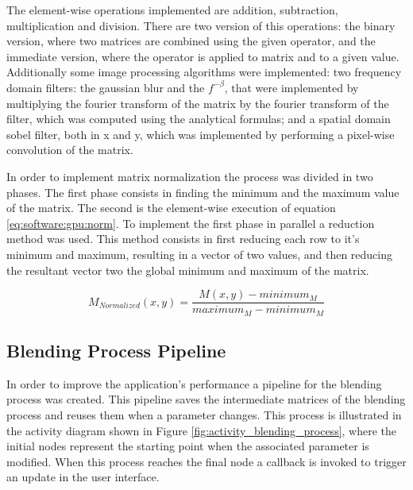 	    The element-wise operations implemented are addition, subtraction, multiplication and division. There are two version of this operations: the binary version, where two matrices are combined using the given operator, and the immediate version, where the operator is applied to matrix and to a given value. Additionally some image processing algorithms were implemented: two frequency domain filters: the gaussian blur and the $f^{-\beta}$, that were implemented by multiplying the fourier transform of the matrix by the fourier transform of the filter, which was computed using the analytical formulas; and a spatial domain sobel filter, both in x and y, which was implemented by performing a pixel-wise convolution of the matrix.
	    
	    In order to implement matrix normalization the process was divided in two phases. The first phase consists in finding the minimum and the maximum value of the matrix. The second is the element-wise execution of equation \ref{eq:software:gpu:norm}. To implement the first phase in parallel a reduction method was used. This method consists in first reducing each row to it's minimum and maximum, resulting in a vector of two values, and then reducing the resultant vector two the global minimum and maximum of the matrix.
	    
	    \begin{equation} \label{eq:software:gpu:norm}
		  M_{Normalized}(x, y) = \frac{M(x, y) - minimum_M}{maximum_M - minimum_M}
	    \end{equation}
	    \myequation{}
	    
    \subsection {Blending Process Pipeline} %
      
      In order to improve the application's performance a pipeline for the blending process was created. This pipeline saves the intermediate matrices of the blending process and reuses them when a parameter changes. This process is illustrated in the activity diagram shown in Figure \ref{fig:activity_blending_process}, where the initial nodes represent the starting point when the associated parameter is modified. When this process reaches the final node a callback is invoked to trigger an update in the user interface.
      
